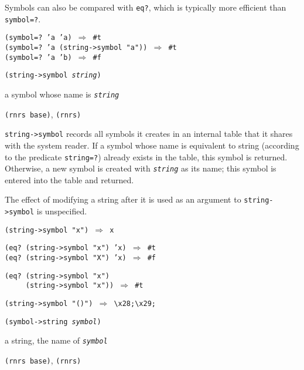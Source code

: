 Symbols can also be compared with \texttt{eq?}, which is typically more
efficient than \texttt{symbol=?}.


\begin{alltt}
(symbol=? 'a 'a) \(\Rightarrow\) \#{}t
(symbol=? 'a (string-\textgreater{}symbol "a")) \(\Rightarrow\) \#{}t
(symbol=? 'a 'b) \(\Rightarrow\) \#{}f
\end{alltt}

\begin{description}

\label{objects_s269}\item[procedure] \texttt{(string-\textgreater{}symbol \textit{string})}



\item[returns] a symbol whose name is \texttt{\textit{string}}


\item[libraries] \texttt{(rnrs base)}, \texttt{(rnrs)}
\end{description}

\texttt{string-\textgreater{}symbol} records all symbols it creates in an internal table
that it shares with the system reader.
If a symbol whose name is equivalent to string (according to the predicate
\texttt{string=?}) already exists in the table, this symbol is returned.
Otherwise, a new symbol is created with \texttt{\textit{string}} as its name; this
symbol is entered into the table and returned.

The effect of modifying a string after it is used as an argument to
\texttt{string-\textgreater{}symbol} is unspecified.


\begin{alltt}
(string-\textgreater{}symbol "x") \(\Rightarrow\) x

(eq? (string-\textgreater{}symbol "x") 'x) \(\Rightarrow\) \#{}t
(eq? (string-\textgreater{}symbol "X") 'x) \(\Rightarrow\) \#{}f

(eq? (string-\textgreater{}symbol "x")
     (string-\textgreater{}symbol "x")) \(\Rightarrow\) \#{}t

(string-\textgreater{}symbol "()") \(\Rightarrow\) \textbackslash{}x28;\textbackslash{}x29;
\end{alltt}

\begin{description}

\label{objects_s270}\item[procedure] \texttt{(symbol-\textgreater{}string \textit{symbol})}



\item[returns] a string, the name of \texttt{\textit{symbol}}


\item[libraries] \texttt{(rnrs base)}, \texttt{(rnrs)}
\end{description}


